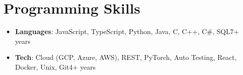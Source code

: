 \documentclass[letterpaper,11pt]{article}
\makeatletter
\newcommand{\resumeLineItem}[3]{
    \item[]{
        \textbf{#1}{: #2}\hfill{#3}\vspace{-6pt}
    }
}
\newcommand{\resumeTopItem}[4]{
    \vspace{-1pt}\item[]
    \begin{tabular*}{0.97\textwidth}{l@{\extracolsep{\fill}}r}
        \textbf{#1} -- \textit{#2} & #3 \\
    \end{tabular*}\vspace{-5pt}
    \item[]{\small{#4}}\vspace{-2pt}
}
\newcommand{\resumeSubHeadingListStart}{\begin{itemize}[leftmargin=*]}
\newcommand{\resumeSubHeadingListEnd}{\end{itemize}}
\makeatother
\begin{document}

\section{Programming Skills}
\resumeSubHeadingListStart
\resumeLineItem{Languages}{JavaScript, TypeScript, Python, Java, C, C++, C\#, SQL}{7+ years}
\resumeLineItem{Tech}{Cloud (GCP, Azure, AWS), REST, PyTorch, Auto Testing, React, Docker, Unix, Git}{4+ years}
\resumeSubHeadingListEnd

\end{document}
